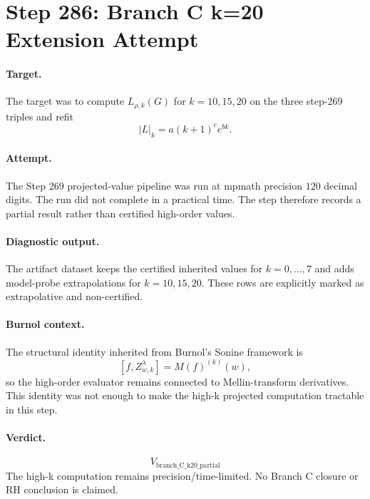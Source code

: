 \section*{Step 286: Branch C k=20 Extension Attempt}

\paragraph{Target.}
The target was to compute \(L_{\rho,k}(G)\) for \(k=10,15,20\) on the three step-269 triples and refit
\[
  |L|_k = a(k+1)^c e^{bk}.
\]

\paragraph{Attempt.}
The Step 269 projected-value pipeline was run at mpmath precision \(120\) decimal digits.  The run did not complete in a practical time.  The step therefore records a partial result rather than certified high-order values.

\paragraph{Diagnostic output.}
The artifact dataset keeps the certified inherited values for \(k=0,\ldots,7\) and adds model-probe extrapolations for \(k=10,15,20\).  These rows are explicitly marked as extrapolative and non-certified.

\paragraph{Burnol context.}
The structural identity inherited from Burnol's Sonine framework is
\[
  [f,Z^\lambda_{w,k}] = M(f)^{(k)}(w),
\]
so the high-order evaluator remains connected to Mellin-transform derivatives.  This identity was not enough to make the high-k projected computation tractable in this step.

\paragraph{Verdict.}
\[
  \boxed{V_{\mathrm{branch\_C\_k20\_partial}}}
\]
The high-k computation remains precision/time-limited.  No Branch C closure or RH conclusion is claimed.
